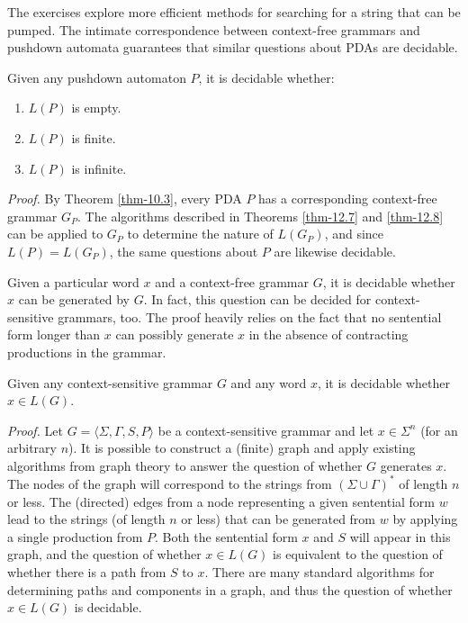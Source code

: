 The exercises explore more efficient methods for searching for a string that
can be pumped. The intimate correspondence between context-free grammars and
pushdown automata guarantees that similar questions about PDAs are decidable.

\begin{cor}\label{cor-12.1}
Given any pushdown automaton $P$, it is decidable whether:
\begin{enumerate}[\textbf{a.}]
\item $L(P)$ is empty.
\item $L(P)$ is finite.
\item $L(P)$ is infinite.
\end{enumerate}

\emph{Proof.} By Theorem \ref{thm-10.3}, every PDA $P$ has a corresponding
context-free grammar $G_P$. The algorithms described in Theorems \ref{thm-12.7}
and \ref{thm-12.8} can be applied to $G_P$ to determine the nature of $L(G_P)$,
and since $L(P)=L(G_P)$, the same questions about $P$ are likewise decidable.
\end{cor}

Given a particular word $x$ and a context-free grammar $G$, it is decidable
whether $x$ can be generated by $G$. In fact, this question can be decided for
context-sensitive grammars, too. The proof heavily relies on the fact that no
sentential form longer than $x$ can possibly generate $x$ in the absence of
contracting productions in the grammar.

\begin{thm}\label{thm-12.9}
Given any context-sensitive grammar $G$ and any word $x$, it is decidable
whether $x\in L(G)$.

\emph{Proof.} Let $G=\langle\Sigma,\Gamma,S,P\rangle$ be a context-sensitive
grammar and let $x\in\Sigma^n$ (for an arbitrary $n$). It is possible to construct a (finite) graph and
apply existing algorithms from graph theory to answer the question of whether
$G$ generates $x$. The nodes of the graph will correspond to the strings from
$(\Sigma\cup\Gamma)^*$ of length $n$ or less. The (directed) edges from a node
representing a given sentential form $w$ lead to the strings (of length $n$ or
less) that can be generated from $w$ by applying a single production from $P$.
Both the sentential form $x$ and $S$ will appear in this graph, and the question
of whether $x\in L(G)$ is equivalent to the question of whether there is a path
from $S$ to $x$. There are many standard algorithms for determining paths and
components in a graph, and thus the question of whether $x\in L(G)$ is decidable.
\end{thm}

